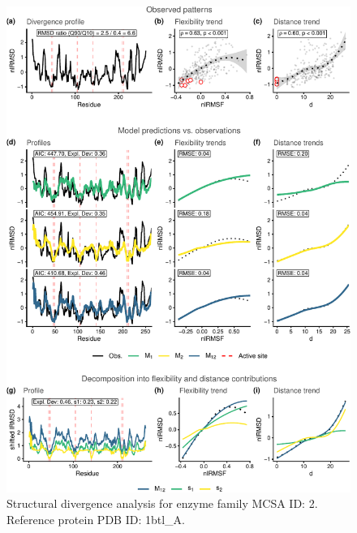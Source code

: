 \documentclass[
]{article}
\begin{document}
\clearpage
\begin{figure}[H]
\centering


\begin{center}\includegraphics{supplementary_material_files/figure-latex/generate_figures-1} \end{center}

\caption{Structural divergence analysis for enzyme family MCSA ID: 2. Reference protein PDB ID: 1btl\_A.}
\end{figure}
\end{document}
